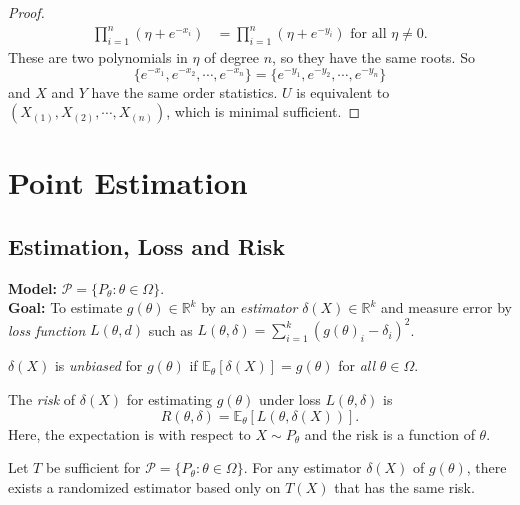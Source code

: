 \documentclass[a4paper]{article}
\begin{document}
\begin{eg}
\begin{proof}
\begin{equation}
\begin{aligned}
				\prod\limits_{i=1}^n(\eta+e^{-x_i})&=\prod\limits_{i=1}^n(\eta+e^{-y_i}) \text{ for all } \eta \neq 0.
			\end{aligned}
		\end{equation}
		These are two polynomials in $\eta$ of degree $n$, so they have the same roots. So
		\begin{equation}
			\{e^{-x_1},e^{-x_2},\cdots,e^{-x_n}\}=\{e^{-y_1},e^{-y_2},\cdots,e^{-y_n}\}
		\end{equation}
		and $X$ and $Y$ have the same order statistics. $U$ is equivalent to $(X_{(1)},X_{(2)},\cdots,X_{(n)})$, which is minimal sufficient.
	\end{proof}
\end{eg}

\section{Point Estimation}

\subsection{Estimation, Loss and Risk}

\textbf{Model:} $\mathcal{P} = \{P_\theta: \theta \in \Omega \}$.\\
\textbf{Goal:} To estimate $g(\theta) \in \mathbb{R}^k$ by an \emph{estimator} $\delta(X) \in \mathbb{R}^k$ and measure error by \emph{loss function} $L(\theta,d)$ such as $L(\theta,\delta) = \sum\limits_{i=1}^k (g(\theta)_i - \delta_i)^2$.

\begin{defi}[Unbiasedness]
	$\delta(X)$ is \emph{unbiased} for $g(\theta)$ if $\mathbb{E}_\theta[\delta(X)]=g(\theta)$ for \emph{all} $\theta \in \Omega$.
\end{defi}

\begin{defi}[Risk]
	The \emph{risk} of $\delta(X)$ for estimating $g(\theta)$ under loss $L(\theta,\delta)$ is
	\begin{equation}
		R(\theta,\delta)=\mathbb{E}_\theta[L(\theta,\delta(X))].
	\end{equation}
	Here, the expectation is with respect to $X \sim P_\theta$ and the risk is a function of $\theta$.
\end{defi}

\begin{prop}
	Let $T$ be sufficient for $\mathcal{P}=\{P_\theta: \theta \in \Omega\}$. For any estimator $\delta(X)$ of $g(\theta)$, there exists a randomized estimator based only on $T(X)$ that has the same risk.
\end{prop}
\end{document}
